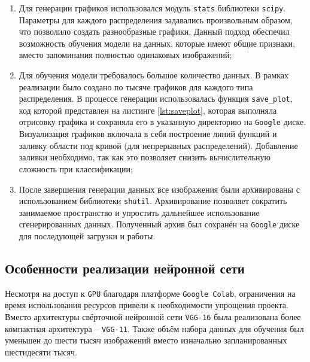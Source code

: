 \documentclass[14pt, russian]{scrartcl}
\begin{document}
\begin{enumerate} 
    \item Для генерации графиков использовался модуль \verb|stats| библиотеки \verb|scipy|. Параметры для каждого распределения задавались произвольным образом, что позволило создать разнообразные графики. Данный подход обеспечил возможность обучения модели на данных, которые имеют общие признаки, вместо запоминания полностью одинаковых изображений;
    \item Для обучения модели требовалось большое количество данных. В рамках реализации было создано по тысяче графиков для каждого типа распределения. В процессе генерации использовалась функция \verb|save_plot|, код которой представлен на листинге \ref{lst:saveplot}, которая выполняла отрисовку графика и сохраняла его в указанную директорию на \verb|Google| диске. Визуализация графиков включала в себя построение линий функций и заливку области под кривой (для непрерывных распределений). Добавление заливки необходимо, так как это позволяет снизить вычислительную сложность при классификации;
    \item После завершения генерации данных все изображения были архивированы с использованием библиотеки \verb|shutil|. Архивирование позволяет сократить занимаемое пространство и упростить дальнейшее использование сгенерированных данных. Полученный архив был сохранён на \verb|Google| диске для последующей загрузки и работы.
\end{enumerate}

\subsection{Особенности реализации нейронной сети}

Несмотря на доступ к \verb|GPU| благодаря платформе \verb|Google Colab|, ограничения на время использования ресурсов привели к необходимости упрощения проекта. Вместо архитектуры свёрточной нейронной сети \verb|VGG-16|\cite{vgg16} была реализована более компактная архитектура -- \verb|VGG-11|\cite{vgg11}. Также объём набора данных для обучения был уменьшен до шести тысяч изображений вместо изначально запланированных шестидесяти тысяч.
\end{document}
